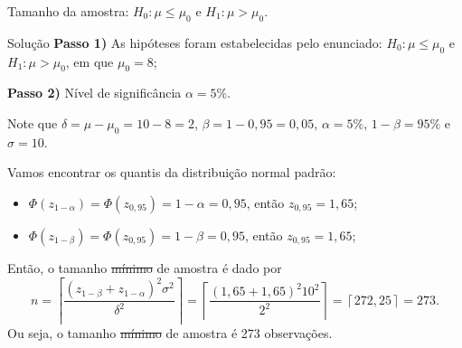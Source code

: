 \documentclass[8pt]{beamer}
\begin{document}
\begin{frame}{Tamanho da amostra: $H_0:\mu \leq \mu_0$ e $H_1: \mu > \mu_0$.}

\begin{block}{Solução}
	\textbf{Passo 1)} As hipóteses foram estabelecidas pelo enunciado: $H_0: \mu \leq \mu_0$ e $H_1: \mu > \mu_0$, em que $\mu_0 = 8$;
	
	\textbf{Passo 2)} Nível de significância $\alpha=5\%$.
	
	Note que $\delta=\mu-\mu_0=10-8=2$, $\beta=1-0,95=0,05$, $\alpha = 5\%$, $1-\beta = 95\%$ e $\sigma=10$.
	
	Vamos encontrar os quantis da distribuição normal padrão:
	\begin{itemize}
		\item $\Phi\left(z_{1-\alpha}\right)=\Phi\left(z_{0,95}\right) = 1-\alpha = 0,95$, então $z_{0,95} = 1,65$;
		\item $\Phi\left(z_{1-\beta}\right)=\Phi\left(z_{0,95}\right) = 1-\beta = 0,95$, então $z_{0,95} = 1,65$;
	\end{itemize}
	
	Então, o tamanho \sout{mínimo} de amostra é dado por
	$$n = \left\lceil \frac{(z_{1-\beta} + z_{1-\alpha})^2 \sigma^2}{\delta^2} \right\rceil = \left\lceil \frac{(1,65+1,65)^2 10^2}{2^2} \right\rceil = \left\lceil 272,25 \right\rceil = 273.$$
	Ou seja, o tamanho \sout{mínimo} de amostra é 273 observações. 
	
\end{block}

\end{frame}
\end{document}
